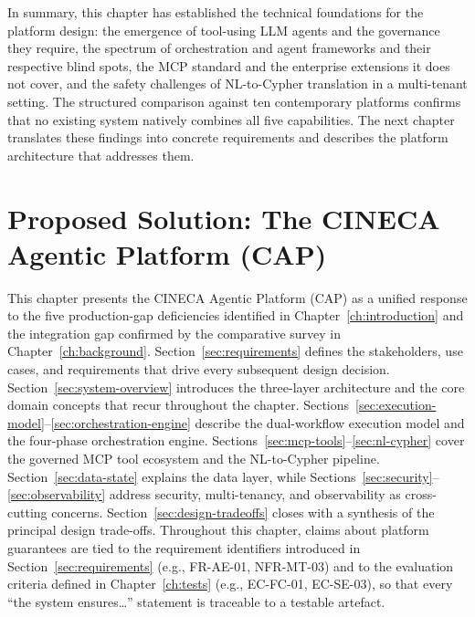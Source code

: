 \documentclass[a4paper,noexaminfo]{sapthesis}
\begin{document}
\bigskip
\noindent
In summary, this chapter has established the technical foundations for the
platform design: the emergence of tool-using LLM agents and the governance
they require, the spectrum of orchestration and agent frameworks and their
respective blind spots, the MCP standard and the enterprise extensions it
does not cover, and the safety challenges of NL-to-Cypher translation in a
multi-tenant setting.  The structured comparison against ten contemporary
platforms confirms that no existing system natively combines all five
capabilities.  The next chapter translates these findings into concrete
requirements and describes the platform architecture that addresses them.


\chapter{Proposed Solution: The CINECA Agentic Platform (CAP)}
\label{ch:proposed-solution}

This chapter presents the CINECA Agentic Platform (CAP) as a unified
response to the five production-gap deficiencies identified in
Chapter~\ref{ch:introduction} and the integration gap confirmed by the
comparative survey in Chapter~\ref{ch:background}.
Section~\ref{sec:requirements} defines the stakeholders, use cases, and
requirements that drive every subsequent design decision.
Section~\ref{sec:system-overview} introduces the three-layer architecture
and the core domain concepts that recur throughout the chapter.
Sections~\ref{sec:execution-model}--\ref{sec:orchestration-engine} describe
the dual-workflow execution model and the four-phase orchestration engine.
Sections~\ref{sec:mcp-tools}--\ref{sec:nl-cypher} cover the governed MCP
tool ecosystem and the NL-to-Cypher pipeline.
Section~\ref{sec:data-state} explains the data layer, while
Sections~\ref{sec:security}--\ref{sec:observability} address security,
multi-tenancy, and observability as cross-cutting concerns.
Section~\ref{sec:design-tradeoffs} closes with a synthesis of the
principal design trade-offs.  Throughout this chapter, claims about
platform guarantees are tied to the requirement identifiers
introduced in Section~\ref{sec:requirements} (e.g., FR-AE-01, NFR-MT-03)
and to the evaluation criteria defined in Chapter~\ref{ch:tests} (e.g.,
EC-FC-01, EC-SE-03), so that every ``the system ensures\ldots'' statement
is traceable to a testable artefact.
\end{document}
